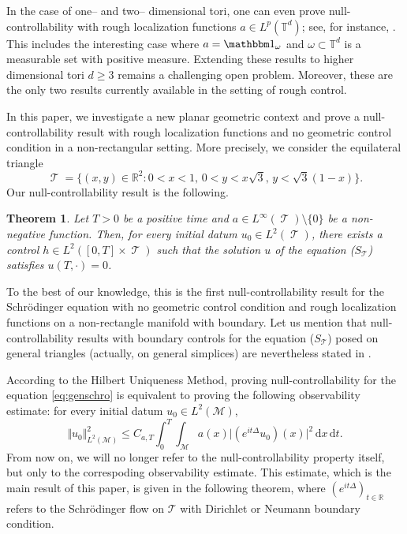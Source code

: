 \documentclass[a4paper,11pt]{amsart}
\numberwithin{equation}{section}
\newtheorem{thm}{Theorem}[section]
\theoremstyle{definition}
\DeclareMathOperator{\var}{\mathcal T}
\begin{document}
In the case of one-- and two-- dimensional tori, one can even prove null-controllability with rough localization functions $a\in L^p(\mathbb T^d)$; see, for instance, \cite{AT, BZ, LBM, NWX}. This includes the interesting case where $a = \mathbbm1_{\omega}$ and $\omega\subset\mathbb T^d$ is a measurable set with positive measure. Extending these results to higher dimensional tori $d\geq3$ remains a challenging open problem. Moreover, these are the only two results currently available in the setting of rough control.

In this paper, we investigate a new planar geometric context and prove a null-controllability result with rough localization functions and no geometric control condition in a non-rectangular setting. More precisely, we consider the equilateral triangle
\[
    \var = \big\{(x,y)\in\mathbb R^2 : 0<x<1,\,0<y<x\sqrt{3},\,y<\sqrt{3}(1-x)\big\}.
\]
Our null-controllability result is the following.

\begin{thm} Let $T>0$ be a positive time and $a\in L^{\infty}(\var)\setminus\{0\}$ be a non-negative function. Then, for every initial datum $u_0\in L^2(\var)$, there exists a control $h\in L^2([0,T]\times\var)$ such that the solution $u$ of the equation {\rm (}\hyperref[eq:genschro]{$S_{\var}$}{\rm )} satisfies $u(T,\cdot)=0$.
\end{thm}

To the best of our knowledge, this is the first null-controllability result for the Schr\"odinger equation with no geometric control condition and rough localization functions on a non-rectangle manifold with boundary. 
Let us mention that null-controllability results with boundary controls for the equation (\hyperref[eq:genschro]{$S_{\var}$}) posed on general triangles (actually, on general simplices) are nevertheless stated in \cite[Theorem 2]{CC}.

According to the Hilbert Uniqueness Method, proving null-controllability for the equation \eqref{eq:genschro} is equivalent to proving the following observability estimate: for every initial datum $u_0\in L^2(\mathcal M)$,
\begin{equation}\label{eq:genobs}
	\Vert u_0\Vert^2_{L^2(\mathcal M)}\le C_{a,T}\int_0^T\int_{\mathcal M}a(x)\big\vert(e^{it\Delta}u_0)(x)\big\vert^2\,\mathrm dx\,\mathrm dt.
\end{equation}
From now on, we will no longer refer to the null-controllability property itself, but only to the correspoding observability estimate. This estimate, which is the main result of this paper, is given in the following theorem,  where $(e^{it\Delta})_{t\in \mathbb R}$ refers to the Schr\"odinger flow on $\mathcal T$ with Dirichlet or Neumann boundary condition.
\end{document}
